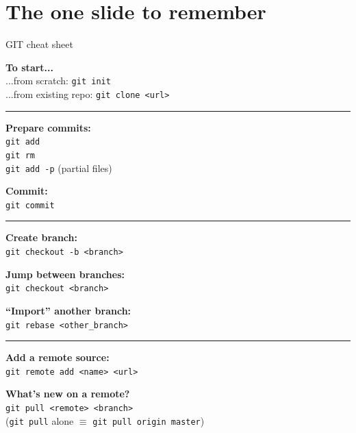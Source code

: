 \documentclass[compress]{beamer}
\begin{document}

\section[Summary]{The one slide to remember}

\begin{frame}{GIT cheat sheet}
\scriptsize
    \begin{multicols}{2}

    {\bf To start...}\\
    ...from scratch: \texttt{git init}\\
    ...from existing repo: \texttt{git clone <url>}\par

    \rule{\columnwidth}{0.2pt}

    {\bf Prepare commits:}\\
    \texttt{git add}\\
    \texttt{git rm}\\
    \texttt{git add -p} (partial files)\par

    {\bf Commit:}\\
    \texttt{git commit}\par

    \rule{\columnwidth}{0.2pt}

    {\bf Create branch:}\\
    \texttt{git checkout -b <branch>}\par

    {\bf Jump between branches:}\\
    \texttt{git checkout <branch>}\par

    {\bf ``Import'' another branch:}\\
    \texttt{git rebase <other\_branch>}\par

    \rule{\columnwidth}{0.2pt}

    {\bf Add a remote source:}\\
    \texttt{git remote add <name> <url>}\par

    {\bf What's new on a remote?}\\
    \texttt{git pull <remote> <branch>}\\
    {\tiny (\texttt{git pull} alone $\equiv$ \texttt{git pull origin master})}\par


\end{multicols}
\end{frame}
\end{document}
